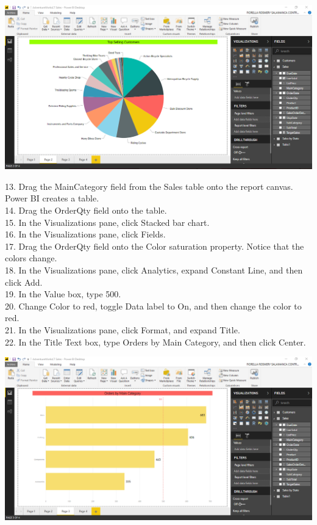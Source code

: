 	\begin{center}
	\includegraphics[width=17cm]{./Imagenes/Ejercicio2/Tarea1/2}
	\end{center}	

13. Drag the MainCategory field from the Sales table onto the report canvas. Power BI creates a table.\\
14. Drag the OrderQty field onto the table.\\
15. In the Visualizations pane, click Stacked bar chart.\\
16. In the Visualizations pane, click Fields.\\
17. Drag the OrderQty field onto the Color saturation property. Notice that the colors change.\\
18. In the Visualizations pane, click Analytics, expand Constant Line, and then click Add.\\
19. In the Value box, type 500.\\
20. Change Color to red, toggle Data label to On, and then change the color to red.\\
21. In the Visualizations pane, click Format, and expand Title.\\
22. In the Title Text box, type Orders by Main Category, and then click Center.\\

	\begin{center}
	\includegraphics[width=17cm]{./Imagenes/Ejercicio2/Tarea1/3}
	\end{center}	

